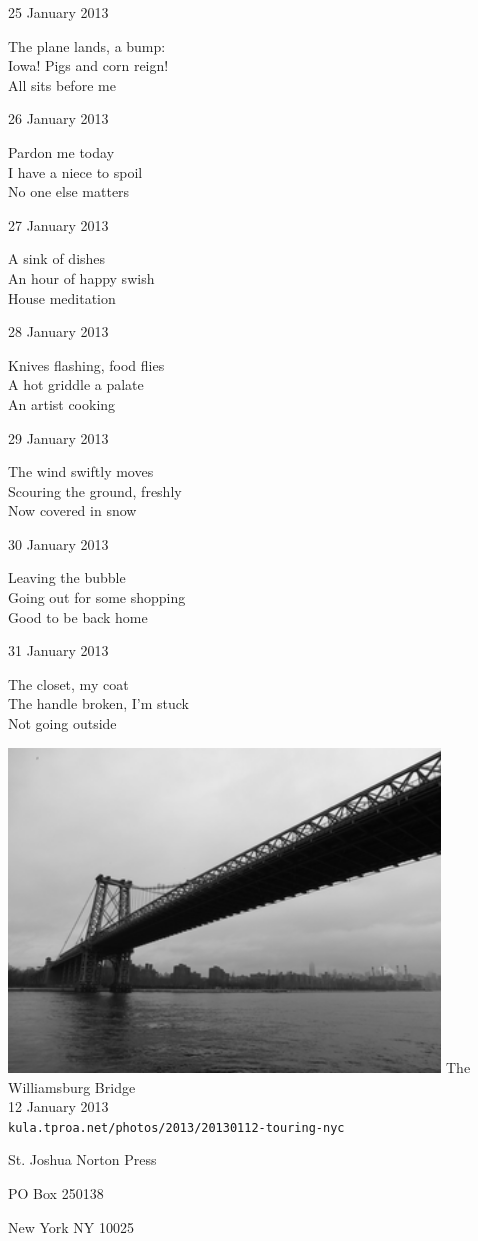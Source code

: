 \documentclass[12pt]{article}
\begin{document}
\newpage

25 January 2013

The plane lands, a bump: \\
Iowa! Pigs and corn reign! \\
All sits before me

26 January 2013

Pardon me today \\
I have a niece to spoil \\
No one else matters

27 January 2013

A sink of dishes \\
An hour of happy swish \\
House meditation

28 January 2013

Knives flashing, food flies \\
A hot griddle a palate \\
An artist cooking

29 January 2013

The wind swiftly moves \\
Scouring the ground, freshly \\
Now covered in snow

30 January 2013

Leaving the bubble \\
Going out for some shopping \\
Good to be back home

31 January 2013

The closet, my coat \\
The handle broken, I'm stuck \\
Not going outside


\newpage

\begin{center}
\includegraphics[width=325pt]{bridge.png}
The Williamsburg Bridge \\
12 January 2013 \\
{\tt kula.tproa.net/photos/2013/20130112-touring-nyc }
\end{center}

\newpage

\thispagestyle{empty}
\vspace*{12cm}
\begin{sideways}
\Large{St. Joshua Norton Press}
\end{sideways}
\begin{sideways}
\Large{PO Box 250138}
\end{sideways}
\begin{sideways}
\Large{New York NY 10025}
\end{sideways}
\end{document}
